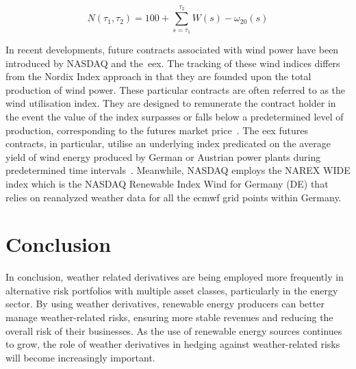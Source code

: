    \begin{equation}
        N (\tau_1, \tau_2) = 100 + \sum_{s=\tau_1}^{\tau_2} W(s) - \omega_{20}(s)
    \label{eq:nordix_wind_speed}
    \end{equation}

    In recent developments, future contracts associated with wind power have been introduced by NASDAQ and the~\gls{eex}.
    The tracking of these wind indices differs from the Nordix Index approach in that they are founded upon the
    total production of wind power.
    These particular contracts are often referred to as the wind utilisation index.
    They are designed to remunerate the contract holder in the event the value of the index surpasses or falls below a
    predetermined level of production, corresponding to the futures market price~\cite{nasdaq_contract_2023}.
    The \gls{eex} futures contracts, in particular, utilise an underlying index predicated on the average yield
    of wind energy produced by German or Austrian power plants during predetermined time intervals~\cite{thomaidis_handling_2023}.
    Meanwhile, NASDAQ employs the NAREX WIDE index which is the NASDAQ Renewable Index Wind for Germany (DE)
    that relies on reanalyzed weather data for all the \gls{ecmwf} grid points within Germany.

\section{Conclusion}
\label{sec:weather_conclusion}

    In conclusion, weather related derivatives are being employed more frequently in alternative risk portfolios with
    multiple asset classes, particularly in the energy sector.
    By using weather derivatives, renewable energy producers can better manage weather-related risks,
    ensuring more stable revenues and reducing the overall risk of their businesses.
    As the use of renewable energy sources continues to grow,
    the role of weather derivatives in hedging against weather-related risks will become increasingly important.


